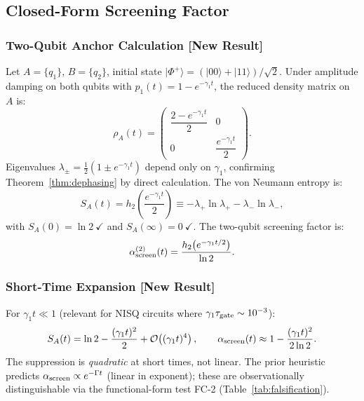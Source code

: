 \documentclass[12pt]{article}
\newcommand{\newresult}{\textbf{[New Result]}}
\begin{document}
\subsection{Closed-Form Screening Factor}

\subsubsection{Two-Qubit Anchor Calculation \newresult}

Let $A = \{q_1\}$, $B = \{q_2\}$, initial state
$|\Phi^+\rangle = (|00\rangle+|11\rangle)/\sqrt{2}$.
Under amplitude damping on both qubits with $p_1(t) = 1 - e^{-\gamma_1 t}$,
the reduced density matrix on $A$ is:
\begin{equation}
\rho_A(t) = \begin{pmatrix}
\dfrac{2-e^{-\gamma_1 t}}{2} & 0\\[6pt]
0 & \dfrac{e^{-\gamma_1 t}}{2}
\end{pmatrix}.
\label{eq:rhoA_2qubit}
\end{equation}
Eigenvalues $\lambda_\pm = \tfrac{1}{2}(1 \pm e^{-\gamma_1 t})$ depend only on $\gamma_1$,
confirming Theorem~\ref{thm:dephasing} by direct calculation. The von Neumann entropy is:
\begin{equation}
S_A(t) = h_2\!\left(\frac{e^{-\gamma_1 t}}{2}\right)
\equiv -\lambda_+\ln\lambda_+ - \lambda_-\ln\lambda_-,
\label{eq:SA_2qubit}
\end{equation}
with $S_A(0) = \ln 2\ \checkmark$ and $S_A(\infty) = 0\ \checkmark$.
The two-qubit screening factor is:
\begin{equation}
\alpha_{\rm screen}^{(2)}(t) = \frac{h_2\!\left(e^{-\gamma_1 t/2}\right)}{\ln 2}.
\label{eq:screen_2qubit}
\end{equation}

\subsubsection{Short-Time Expansion \newresult}

For $\gamma_1 t \ll 1$ (relevant for NISQ circuits where $\gamma_1\tau_{\rm gate}\sim 10^{-3}$):
\begin{equation}
S_A(t) = \ln 2 - \frac{(\gamma_1 t)^2}{2} + \mathcal{O}\!\left((\gamma_1 t)^4\right),
\qquad
\alpha_{\rm screen}(t) \approx 1 - \frac{(\gamma_1 t)^2}{2\ln 2}.
\label{eq:screen_short}
\end{equation}
The suppression is \emph{quadratic} at short times, not linear. The prior heuristic
predicts $\alpha_{\rm screen} \propto e^{-\Gamma t}$ (linear in exponent); these are
observationally distinguishable via the functional-form test FC-2 (Table~\ref{tab:falsification}).
\end{document}
